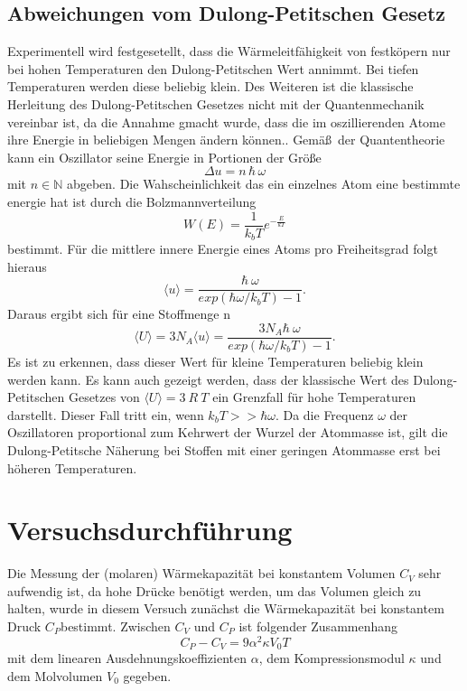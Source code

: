 \documentclass[11pt,ngerman,a4paper]{article}
\begin{document}
\subsection{Abweichungen vom Dulong-Petitschen Gesetz}
Experimentell wird festgesetellt, dass die W\"armeleitf\"ahigkeit von festk\"opern nur bei hohen Temperaturen den Dulong-Petitschen Wert annimmt. Bei tiefen Temperaturen werden diese beliebig klein. Des Weiteren ist die klassische Herleitung des Dulong-Petitschen Gesetzes nicht mit der Quantenmechanik vereinbar ist, da die Annahme gmacht wurde, dass die im oszillierenden Atome ihre Energie in beliebigen Mengen \"andern k\"onnen.. Gem\"a\ss \ der Quantentheorie kann ein Oszillator seine Energie in Portionen der Gr\"o\ss e 
\begin{equation}
\Delta u = n\,\hbar\,\omega
\end{equation}
mit $n \in  \mathbb{N}$ abgeben. Die Wahscheinlichkeit das ein einzelnes Atom eine bestimmte energie hat ist durch die Bolzmannverteilung
\begin{equation}
W(E) = \frac{1}{k_bT} e^{-\frac{E}{kT}}
\end{equation}
bestimmt. F\"ur die mittlere innere Energie eines Atoms pro Freiheitsgrad folgt hieraus
\begin{equation}
\langle u \rangle = \frac{\hbar\ \omega}{exp(\hbar \omega/k_bT)-1}.
\end{equation}
Daraus ergibt sich f\"ur eine Stoffmenge n
\begin{equation}
\langle U \rangle = 3 N_A \langle u \rangle = \frac{3 N_A \hbar\ \omega}{exp(\hbar \omega/k_bT)-1}.
\end{equation}
Es ist zu erkennen, dass dieser Wert f\"ur kleine Temperaturen beliebig klein werden kann. Es kann auch gezeigt werden, dass der klassische Wert des Dulong-Petitschen Gesetzes von $ \langle U \rangle = 3\ R\ T$ ein Grenzfall f\"ur hohe Temperaturen darstellt. Dieser Fall tritt ein, wenn $k_b T >> \hbar \omega$. Da die Frequenz $\omega$ der Oszillatoren proportional zum Kehrwert der Wurzel der Atommasse ist, gilt die Dulong-Petitsche N\"aherung bei Stoffen mit einer geringen Atommasse erst bei h\"oheren Temperaturen.
 \section{Versuchsdurchf\"uhrung}
 Die Messung der (molaren) W\"armekapazit\"at bei konstantem Volumen $C_V$ sehr aufwendig ist, da hohe Dr\"ucke ben\"otigt werden, um das Volumen gleich zu halten, wurde in diesem Versuch zun\"achst die W\"armekapazit\"at bei konstantem Druck $C_P$bestimmt. Zwischen $C_V$ und $C_P$ ist folgender Zusammenhang 
 \begin{equation}
C_P-C_V = 9 \alpha^2 \kappa V_0 T
 \end{equation}
 mit dem linearen Ausdehnungskoeffizienten $\alpha$, dem Kompressionsmodul $\kappa$ und dem Molvolumen $V_0$ gegeben.
\end{document}
